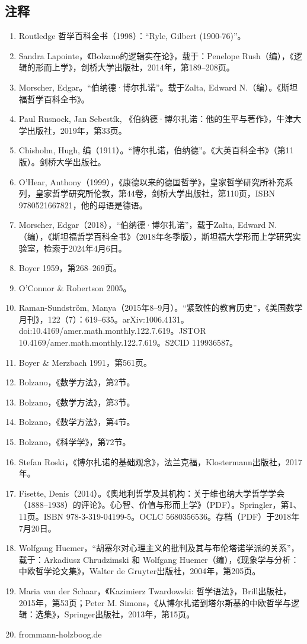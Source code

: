 \subsection{注释}  
\begin{enumerate}
\item Routledge 哲学百科全书（1998）：“Ryle, Gilbert (1900-76)”。  
\item Sandra Lapointe，《Bolzano的逻辑实在论》，载于：Penelope Rush（编），《逻辑的形而上学》，剑桥大学出版社，2014年，第189–208页。  
\item Morscher, Edgar。“伯纳德·博尔扎诺”。载于Zalta, Edward N.（编）。《斯坦福哲学百科全书》。  
\item Paul Rusnock, Jan Sebestík, 《伯纳德·博尔扎诺：他的生平与著作》，牛津大学出版社，2019年，第33页。  
\item Chisholm, Hugh, 编（1911）。“博尔扎诺，伯纳德”。《大英百科全书》（第11版）。剑桥大学出版社。  
\item O'Hear, Anthony（1999），《康德以来的德国哲学》，皇家哲学研究所补充系列，皇家哲学研究所伦敦，第44卷，剑桥大学出版社，第110页，ISBN 9780521667821，他的母语是德语。  
\item Morscher, Edgar（2018），“伯纳德·博尔扎诺”，载于Zalta, Edward N.（编），《斯坦福哲学百科全书》（2018年冬季版），斯坦福大学形而上学研究实验室，检索于2024年4月6日。  
\item Boyer 1959，第268–269页。  
\item O'Connor & Robertson 2005。  
\item Raman-Sundström, Manya（2015年8–9月）。“紧致性的教育历史”，《美国数学月刊》，122（7）：619–635。arXiv:1006.4131。doi:10.4169/amer.math.monthly.122.7.619。JSTOR 10.4169/amer.math.monthly.122.7.619。S2CID 119936587。  
\item Boyer & Merzbach 1991，第561页。  
\item Bolzano，《数学方法》，第2节。  
\item Bolzano，《数学方法》，第3节。  
\item Bolzano，《数学方法》，第4节。  
\item Bolzano，《科学学》，第72节。  
\item Stefan Roski，《博尔扎诺的基础观念》，法兰克福，Klostermann出版社，2017年。  
\item Fisette, Denis（2014）。《奥地利哲学及其机构：关于维也纳大学哲学学会（1888–1938）的评论》。《心智、价值与形而上学》（PDF）。Springler，第1、11页。ISBN 978-3-319-04199-5。OCLC 5680356536。存档（PDF）于2018年7月20日。  
\item Wolfgang Huemer，“胡塞尔对心理主义的批判及其与布伦塔诺学派的关系”，载于：Arkadiusz Chrudzimski 和 Wolfgang Huemer（编），《现象学与分析：中欧哲学论文集》，Walter de Gruyter出版社，2004年，第205页。  
\item Maria van der Schaar，《Kazimierz Twardowski: 哲学语法》，Brill出版社，2015年，第53页；Peter M. Simons，《从博尔扎诺到塔尔斯基的中欧哲学与逻辑：选集》，Springer出版社，2013年，第15页。  
\item frommann-holzboog.de
\end{enumerate}
